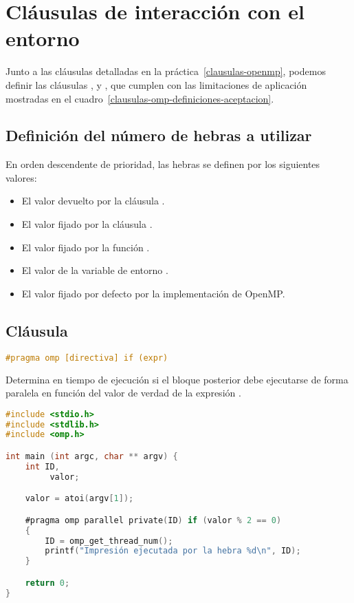 \section{Cláusulas de interacción con el entorno}

Junto a las cláusulas detalladas en la práctica~\ref{clausulas-openmp}, podemos definir las cláusulas ,  y , que cumplen con las limitaciones de aplicación mostradas en el cuadro~\ref{clausulas-omp-definiciones-aceptacion}.

\subsection{Definición del número de hebras a utilizar}

En orden descendente de prioridad, las hebras se definen por los siguientes valores:

\begin{itemize}
	\item El valor devuelto por la cláusula .
	\item El valor fijado por la cláusula .
	\item El valor fijado por la función .
	\item El valor de la variable de entorno .
	\item El valor fijado por defecto por la implementación de OpenMP\@.
\end{itemize}

\subsection{Cláusula }

\begin{lstlisting}[language=C]
#pragma omp [directiva] if (expr)
\end{lstlisting}

Determina en tiempo de ejecución si el bloque posterior debe ejecutarse de forma paralela en función del valor de verdad de la expresión .

\begin{lstlisting}[language=C]
#include <stdio.h>
#include <stdlib.h>
#include <omp.h>

int main (int argc, char ** argv) {
	int ID,
		 valor;

	valor = atoi(argv[1]);

	#pragma omp parallel private(ID) if (valor % 2 == 0)
	{
		ID = omp_get_thread_num();
		printf("Impresión ejecutada por la hebra %d\n", ID);
	}

	return 0;
}
\end{lstlisting}


